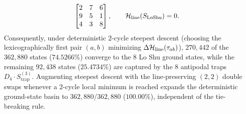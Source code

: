 \begin{theorem}
\begin{equation}
\begin{bmatrix}
    2 & 7 & 6 \\
    9 & 5 & 1 \\
    4 & 3 & 8
  \end{bmatrix}, \qquad \mathcal{H}_{\mathrm{line}}(S_{\mathrm{LoShu}}) = 0.
\end{equation}
Consequently, under deterministic $2$-cycle steepest descent (choosing the lexicographically first pair $(a,b)$ minimizing $\Delta\mathcal{H}_{\mathrm{line}}(\tau_{ab})$), $270{,}442$ of the $362{,}880$ states ($74.5266\%$) converge to the $8$ Lo Shu ground states, while the remaining $92{,}438$ states ($25.4734\%$) are captured by the $8$ antipodal traps $D_4 \cdot S_{\mathrm{trap}}^{(3)}$. Augmenting steepest descent with the line-preserving $(2,2)$ double swaps whenever a $2$-cycle local minimum is reached expands the deterministic ground-state basin to $362{,}880 / 362{,}880$ ($100.00\%$), independent of the tie-breaking rule.
\end{theorem}

